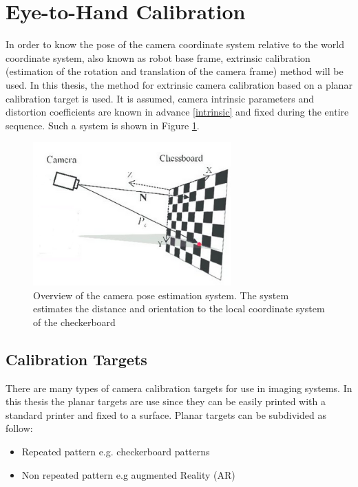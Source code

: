 \section{Eye-to-Hand Calibration}

In order to know the pose of the camera coordinate system relative to the world coordinate system, also known as robot base frame, extrinsic calibration (estimation of the rotation and translation of the camera frame) method will be used. In this thesis, the method for extrinsic camera calibration based on a planar calibration target is used. It is assumed, camera intrinsic parameters and distortion coefficients are known in advance \ref{intrinsic} and fixed during the entire sequence. Such a system is shown in Figure \ref{fig:camposest}.


\begin{figure}[!h]
\begin{center}
\includegraphics[width=3in]{figures03/camposest.png}
\caption{Overview of the camera pose estimation system. The system estimates the distance
and orientation to the local coordinate system of the checkerboard}%
\label{fig:camposest}
\end{center}
\end{figure}

\subsection{Calibration Targets}\label{caltar}
There are many types of camera calibration targets for use in imaging systems. In this thesis the planar targets are use since they can be easily printed with a standard
printer and fixed to a surface. Planar targets can be subdivided as follow:
\begin{itemize}
\item Repeated pattern e.g. checkerboard patterns 
\item Non repeated pattern e.g augmented Reality (AR)
\end{itemize}

